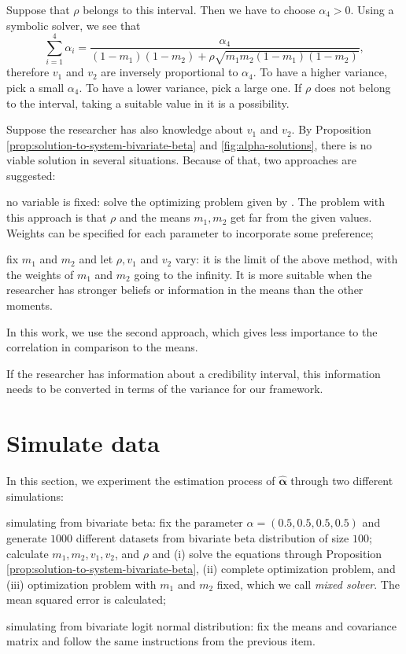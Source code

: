 Suppose that $\rho$ belongs to this interval. Then we have to choose $\alpha_4
> 0$. Using a symbolic solver, we see that 
$$
\sum_{i=1}^4 \alpha_i = \frac{\alpha_4}{(1-m_1)(1-m_2) + \rho\sqrt{m_1m_2(1-m_1)(1-m_2)}}, 
$$
therefore $v_1$ and $v_2$ are inversely proportional to $\alpha_4$. To have a
higher variance, pick a small $\alpha_4$. To have a lower variance, pick a
large one. If $\rho$ does not belong to the interval, taking a suitable value
in it is a possibility. 

Suppose the researcher has also knowledge about $v_1$ and $v_2$. By
Proposition \ref{prop:solution-to-system-bivariate-beta} and
\autoref{fig:alpha-solutions}, there is no viable
solution in several situations. Because of that, two approaches are suggested:

\begin{alineas}
  \item no variable is fixed: solve the optimizing problem given by 
  \textcite[p. 7]{olkin2015constructions}. The problem with this approach is 
  that $\rho$ and the means $m_1, m_2$ get far from the given values.
  Weights can be specified for each parameter to incorporate some preference;  
  \item fix $m_1$ and $m_2$ and let $\rho, v_1$ and $v_2$ vary: it is the
  limit of the above method, with the weights of $m_1$ and $m_2$ going to the
  infinity. It is more suitable when the researcher has stronger beliefs or information in the
  means than the other moments. 
\end{alineas}

In this work, we use the second approach, which gives less importance to the
correlation in comparison to the means. 

\begin{remark}
  If the researcher has information about a credibility interval, this
  information needs to be converted in terms of the variance for our framework.
\end{remark}

\section{Simulate data}

In this section, we experiment the estimation process of $\hat{\boldsymbol{\alpha}}$ through
two different simulations: 

\begin{alineas}
  \item simulating from bivariate beta: fix the parameter $\alpha = (0.5, 0.5,
  0.5, 0.5)$ and generate $1000$
  different datasets from bivariate beta distribution of size $100$; calculate
  $m_1, m_2, v_1, v_2$, and $\rho$ and (i) solve the equations through Proposition
  \eqref{prop:solution-to-system-bivariate-beta}, (ii) complete optimization
  problem, and (iii) optimization problem with $m_1$ and $m_2$ fixed, which we
  call {\em mixed solver}. The mean squared error is calculated;
  \item simulating from bivariate logit normal distribution: fix the means and
  covariance matrix and follow the same instructions from the previous item.
\end{alineas}

